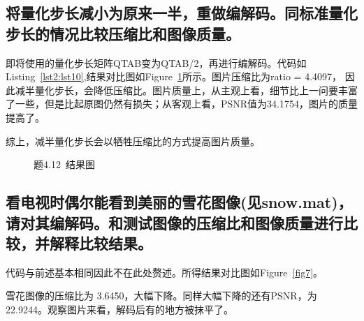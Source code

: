 \documentclass[a4paper]{article}
\begin{document}
		\subsection{将量化步长减小为原来一半，重做编解码。同标准量化步长的情况比较压缩比和图像质量。}
		
		即将使用的量化步长矩阵QTAB变为QTAB/2，再进行编解码。代码如Listing~\ref{lst2:lst10},结果对比图如Figure~\ref{fig6}所示。图片压缩比为ratio = 4.4097， 因此减半量化步长，会降低压缩比。图片质量上，从主观上看，细节比上一问要丰富了一些，但是比起原图仍然有损失；从客观上看，PSNR值为34.1754，图片的质量提高了。
		
		综上，减半量化步长会以牺牲压缩比的方式提高图片质量。
		
		\begin{figure}[t]
			\centering
			\hspace{0.75cm}
			\caption{题4.12~结果图}
			\label{fig6}
		\end{figure}
		
		
		
		\subsection{看电视时偶尔能看到美丽的雪花图像(见snow.mat)，请对其编解码。和测试图像的压缩比和图像质量进行比较，并解释比较结果。}
		代码与前述基本相同因此不在此处赘述。所得结果对比图如Figure~\ref{fig7}。
		
		雪花图像的压缩比为 3.6450，大幅下降。同样大幅下降的还有PSNR，为22.9244。观察图片来看，解码后有的地方被抹平了。
		
\end{document}
